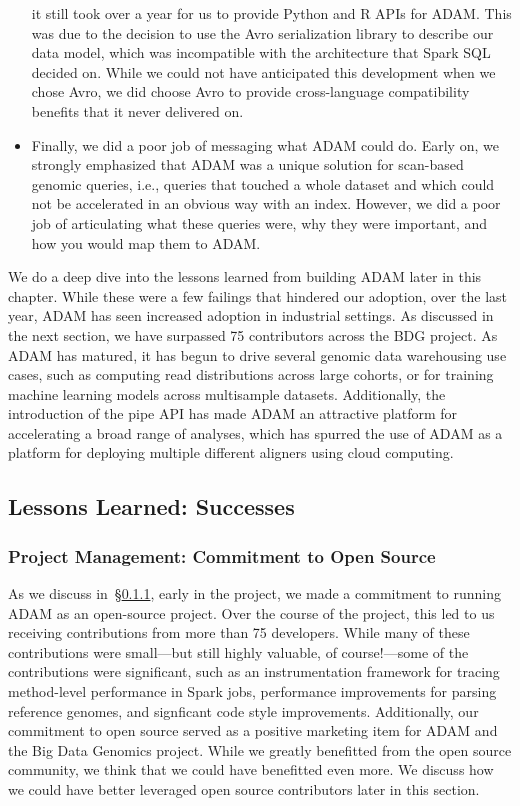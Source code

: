 \documentclass[phd]{ucbthesis}
\begin{document}
\begin{itemize}
  it still took over a year for us to provide Python and R APIs for ADAM. This
  was due to the decision to use the Avro serialization library to describe our
  data model, which was incompatible with the architecture that Spark SQL
  decided on. While we could not have anticipated this development when we chose
  Avro, we did choose Avro to provide cross-language compatibility benefits that
  it never delivered on.
\item Finally, we did a poor job of messaging what ADAM could do. Early on, we
  strongly emphasized that ADAM was a unique solution for scan-based genomic
  queries, i.e., queries that touched a whole dataset and which could not be
  accelerated in an obvious way with an index. However, we did a poor job of
  articulating what these queries were, why they were important, and how you
  would map them to ADAM.
\end{itemize}

We do a deep dive into the lessons learned from building ADAM later in this
chapter.
While these were a few failings that hindered our adoption, over the last year,
ADAM has seen increased adoption in industrial settings. As discussed in the
next section, we have surpassed 75 contributors across the BDG project.
As ADAM has matured, it has begun to drive several genomic data warehousing
use cases, such as computing read distributions across large cohorts, or for
training machine learning models across multisample datasets. Additionally, the
introduction of the pipe API has made ADAM an attractive platform for
accelerating a broad range of analyses, which has spurred the use of ADAM as a
platform for deploying multiple different aligners using cloud computing.

\subsection{Lessons Learned: Successes}
\label{sec:successes}

\subsubsection{Project Management: Commitment to Open Source}
\label{sec:win-oss}

As we discuss in~\S\ref{sec:win-oss}, early in the project, we made a commitment
to running ADAM as an open-source project. Over the course of the project, this
led to us receiving contributions from more than 75 developers. While many of
these contributions were small---but still highly valuable, of course!---some of
the contributions were significant, such as an instrumentation framework for
tracing method-level performance in Spark jobs, performance improvements for
parsing reference genomes, and signficant code style improvements. Additionally,
our commitment to open source served as a positive marketing item for ADAM and
the Big Data Genomics project. While we greatly benefitted from the open source
community, we think that we could have benefitted even more. We discuss how we
could have better leveraged open source contributors later in this section.
\end{document}
